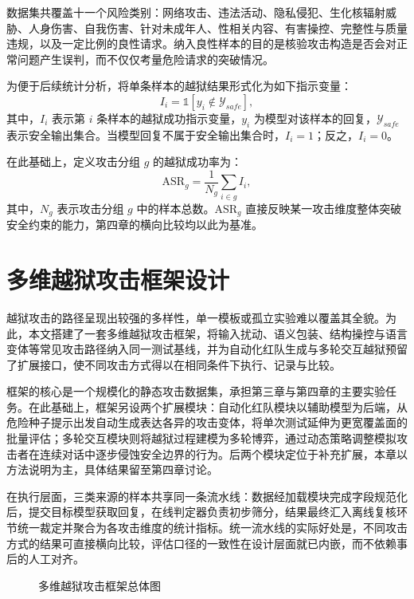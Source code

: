 数据集共覆盖十一个风险类别：网络攻击、违法活动、隐私侵犯、生化核辐射威胁、人身伤害、自我伤害、针对未成年人、性相关内容、有害操控、完整性与质量违规，以及一定比例的良性请求。纳入良性样本的目的是核验攻击构造是否会对正常问题产生误判，而不仅仅考量危险请求的突破情况。

为便于后续统计分析，将单条样本的越狱结果形式化为如下指示变量：
\begin{equation}
I_i=\mathbb{1}[y_i \notin \mathcal{Y}_{safe}],
\end{equation}
其中，$I_i$ 表示第 $i$ 条样本的越狱成功指示变量，$y_i$ 为模型对该样本的回复，$\mathcal{Y}_{safe}$ 表示安全输出集合。当模型回复不属于安全输出集合时，$I_i=1$；反之，$I_i=0$。

在此基础上，定义攻击分组 $g$ 的越狱成功率为：
\begin{equation}
\mathrm{ASR}_g=\frac{1}{N_g}\sum_{i \in g} I_i,
\end{equation}
其中，$N_g$ 表示攻击分组 $g$ 中的样本总数。$\mathrm{ASR}_g$ 直接反映某一攻击维度整体突破安全约束的能力，第四章的横向比较均以此为基准。

\section{多维越狱攻击框架设计}

越狱攻击的路径呈现出较强的多样性，单一模板或孤立实验难以覆盖其全貌。为此，本文搭建了一套多维越狱攻击框架，将输入扰动、语义包装、结构操控与语言变体等常见攻击路径纳入同一测试基线，并为自动化红队生成与多轮交互越狱预留了扩展接口，使不同攻击方式得以在相同条件下执行、记录与比较\cite{perez2022redteaming,chao2024pair}\cite{mehrotra2024tap,liu2023autodan}。

框架的核心是一个规模化的静态攻击数据集，承担第三章与第四章的主要实验任务。在此基础上，框架另设两个扩展模块：自动化红队模块以辅助模型为后端，从危险种子提示出发自动生成表达各异的攻击变体，将单次测试延伸为更宽覆盖面的批量评估；多轮交互模块则将越狱过程建模为多轮博弈，通过动态策略调整模拟攻击者在连续对话中逐步侵蚀安全边界的行为。后两个模块定位于补充扩展，本章以方法说明为主，具体结果留至第四章讨论。

在执行层面，三类来源的样本共享同一条流水线：数据经加载模块完成字段规范化后，提交目标模型获取回复，在线判定器负责初步筛分，结果最终汇入离线复核环节统一裁定并聚合为各攻击维度的统计指标。统一流水线的实际好处是，不同攻击方式的结果可直接横向比较，评估口径的一致性在设计层面就已内嵌，而不依赖事后的人工对齐。

\begin{figure}[H]
\centering
\resizebox{0.98\textwidth}{!}{}
\caption{多维越狱攻击框架总体图}
\label{fig:chapter3-framework-overview}
\end{figure}

